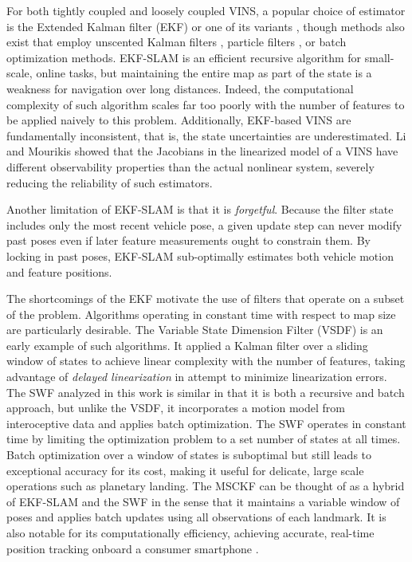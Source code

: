 \documentclass[letterpaper, 10 pt, conference]{ieeeconf}  %
\begin{document}
For both tightly coupled and loosely coupled VINS, a popular choice of estimator is the Extended Kalman filter (EKF) or one of its variants \cite{Huster:2002:OC, You:2001:VR, Kottas:2013:RSS, Kim:2007:RSS, Mourikis:2007:ICRA}, though methods also exist that employ unscented Kalman filters \cite{Ebcin:2007:ION}, particle filters \cite{Fox:1999:JAIR, Pupilli:2005:BMVC}, or batch optimization methods\cite{Triggs:2000va,Strelow:2004:IJR}. 
EKF-SLAM is an efficient recursive algorithm for small-scale, online tasks, but maintaining the entire map as part of the state is a weakness for navigation over long distances.
Indeed, the computational complexity of such algorithm scales far too poorly with the number of features to be applied naively to this problem.
Additionally, EKF-based VINS are fundamentally inconsistent, that is, the state uncertainties are underestimated.
Li and Mourikis \cite{Li:2013coa} showed that the Jacobians in the linearized model of a VINS have different observability properties than the actual nonlinear system, severely reducing the reliability of such estimators.

Another limitation of EKF-SLAM is that it is \textit{forgetful}.
Because the filter state includes only the most recent vehicle pose, a given update step can never modify past poses even if later feature measurements ought to constrain them.
By locking in past poses, EKF-SLAM sub-optimally estimates both vehicle motion and feature positions.

The shortcomings of the EKF motivate the use of filters that operate on a subset of the problem. Algorithms operating in constant time with respect to map size are particularly desirable. The Variable State Dimension Filter (VSDF)\cite{McLauchlan:1993:SPIE} is an early example of such algorithms. It applied a Kalman filter over a sliding window of states to achieve linear complexity with the number of features, taking advantage of \textit{delayed linearization} in attempt to minimize linearization errors. The SWF analyzed in this work is similar in that it is both a recursive and batch approach, but unlike the VSDF, it incorporates a motion model from interoceptive data and applies batch optimization. 
The SWF operates in constant time by limiting the optimization problem to a set number of states at all times. Batch optimization over a window of states is suboptimal but still leads to exceptional accuracy for its cost, making it useful for delicate, large scale operations such as planetary landing\cite{Sibley:2010:JFR}. 
The MSCKF \cite{Mourikis:2006:TechReport,Mourikis:2007:ICRA} can be thought of as a hybrid of EKF-SLAM and the SWF in the sense that it maintains a variable window of poses and applies batch updates using all observations of each landmark. It is also notable for its computationally efficiency, achieving accurate, real-time position tracking onboard a consumer smartphone \cite{Li:2013:ICRA}.
\end{document}

